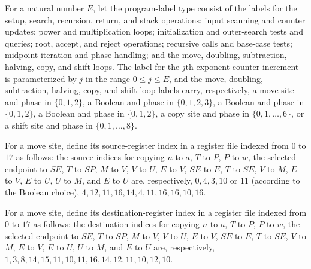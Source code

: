 \begin{definition}
\label{Complexity.LogProg.SavitchARM.Lb}
\leanok
{}
For a natural number $E$, let the program-label type consist of the labels for the
setup, search, recursion, return, and stack operations: input scanning and counter
updates; power and multiplication loops; initialization and outer-search tests and
queries; root, accept, and reject operations; recursive calls and base-case tests;
midpoint iteration and phase handling; and the move, doubling, subtraction, halving,
copy, and shift loops. The label for the $j$th exponent-counter increment is
parameterized by $j$ in the range $0\le j\le E$, and the move, doubling, subtraction,
halving, copy, and shift loop labels carry, respectively, a move site and phase in
$\{0,1,2\}$, a Boolean and phase in $\{0,1,2,3\}$, a Boolean and phase in $\{0,1,2\}$, a
Boolean and phase in $\{0,1,2\}$, a copy site and phase in $\{0,1,\ldots,6\}$, or a
shift site and phase in $\{0,1,\ldots,8\}$.
\end{definition}

\begin{definition}
\label{Complexity.LogProg.SavitchARM.mvSrc}
\leanok
{}
For a move site, define its source-register index in a register file indexed from $0$ to
$17$ as follows: the source indices for copying $n$ to $a$, $T$ to $P$, $P$ to $w$, the
selected endpoint to $SE$, $T$ to $SP$, $M$ to $V$, $V$ to $U$, $E$ to $V$, $SE$ to $E$,
$T$ to $SE$, $V$ to $M$, $E$ to $V$, $E$ to $U$, $U$ to $M$, and $E$ to $U$ are,
respectively, $0,4,3,10$ or $11$ (according to the Boolean choice),
$4,12,11,16,14,4,11,16,16,10,16$.
\end{definition}

\begin{definition}
\label{Complexity.LogProg.SavitchARM.mvDst}
\leanok
{}
For a move site, define its destination-register index in a register file indexed from
$0$ to $17$ as follows: the destination indices for copying $n$ to $a$, $T$ to $P$, $P$
to $w$, the selected endpoint to $SE$, $T$ to $SP$, $M$ to $V$, $V$ to $U$, $E$ to $V$,
$SE$ to $E$, $T$ to $SE$, $V$ to $M$, $E$ to $V$, $E$ to $U$, $U$ to $M$, and $E$ to $U$
are, respectively, $1,3,8,14,15,11,10,11,16,14,12,11,10,12,10$.
\end{definition}

